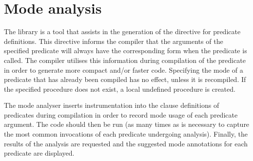 \section{Mode analysis}
The  library is a tool that assists in the generation
of the  directive for predicate definitions. This directive
informs
the compiler that the arguments of the specified predicate will always
have the corresponding form when the predicate is called. The compiler
utilises this information during compilation of the predicate in order
to generate more compact and/or faster code. Specifying the mode of a
predicate that has already been compiled has no effect, unless it is
recompiled. If the specified procedure does not exist, a local undefined
procedure is created.

The mode analyser inserts instrumentation into the clause definitions
of predicates during compilation in order to record mode usage of each
predicate argument. The code should then be run (as many times as is
necessary to capture the most common invocations of each predicate
undergoing analysis). Finally, the results of the analysis are requested
and the suggested mode annotations for each predicate are displayed.

